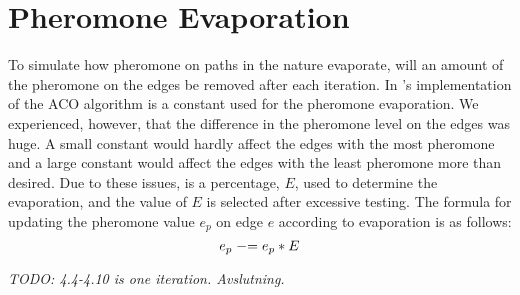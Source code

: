 \section{Pheromone Evaporation}

To simulate how pheromone on paths in the nature evaporate, will an amount of the pheromone on the edges be removed after each iteration. In \citet{nanda11}'s implementation of the ACO algorithm is a constant used for the pheromone evaporation. We experienced, however, that the difference in the pheromone level on the edges was huge. A small constant would hardly affect the edges with the most pheromone and a large constant would affect the edges with the least pheromone more than desired. Due to these issues, is a percentage, $E$, used to determine the evaporation, and the value of $E$ is selected after excessive testing.
The formula for updating the pheromone value $e_p$ on edge $e$ according to evaporation is as follows: 
\newline
$$e_p \mathrel{-}= e_p*E$$
\newline


\emph{\color{blue} TODO: 4.4-4.10 is one iteration. Avslutning.}
